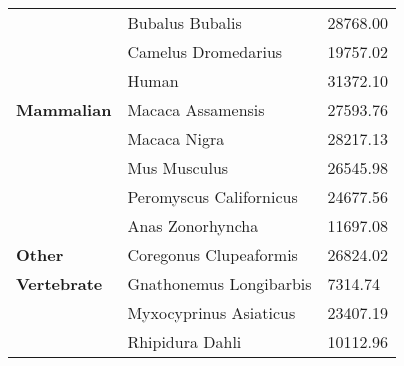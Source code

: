 \documentclass{article}
\begin{document}
\begin{longtable}{lll}
	\midrule
	
	\multirow{7}{*}{\textbf{Mammalian}} 
 & Bubalus Bubalis & 28768.00 \\
& Camelus Dromedarius & 19757.02 \\
& Human & 31372.10 \\
& Macaca Assamensis & 27593.76 \\
& Macaca Nigra & 28217.13 \\
& Mus Musculus & 26545.98 \\
& Peromyscus Californicus & 24677.56 \\
	
	\midrule

 & Anas Zonorhyncha & 11697.08 \\
\textbf{Other} & Coregonus Clupeaformis & 26824.02 \\
\textbf{Vertebrate} & Gnathonemus Longibarbis & 7314.74 \\
& Myxocyprinus Asiaticus & 23407.19 \\
& Rhipidura Dahli & 10112.96 \\
	
 \midrule


\end{longtable}
\end{document}
